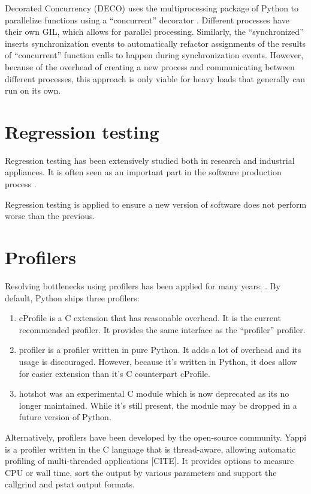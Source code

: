 Decorated Concurrency (DECO) uses the multiprocessing package of Python to parallelize functions using a ``concurrent'' decorator \cite{sherman2016deco}.
Different processes have their own GIL, which allows for parallel processing.
Similarly, the ``synchronized''  inserts synchronization events to automatically refactor assignments of the results of ``concurrent'' function calls to happen during synchronization events.
However, because of the overhead of creating a new process and communicating between different processes, this approach is only viable for heavy loads that generally can run on its own.

\section{Regression testing}
Regression testing has been extensively studied both in research and industrial appliances.
It is often seen as an important part in the software production process \cite{ghaith2013profile}.

Regression testing is applied to ensure a new version of software does not perform worse than the previous.



\section{Profilers}
Resolving bottlenecks using profilers has been applied for many years: \cite{pesterev2010locating, gorelick2014high, fan2013performance}.
By default, Python ships three profilers:

\begin{enumerate}
	\item cProfile is a C extension that has reasonable overhead. It is the current recommended profiler. It provides the same interface as the ``profiler'' profiler.
	\item profiler is a profiler written in pure Python. It adds a lot of overhead and its usage is discouraged. However, because it's written in Python, it does allow for easier extension than it's C counterpart cProfile.
	\item hotshot was an experimental C module which is now deprecated as its no longer maintained. While it's still present, the module may be dropped in a future version of Python.
\end{enumerate}

Alternatively, profilers have been developed by the open-source community.
Yappi is a profiler written in the C language that is thread-aware, allowing automatic profiling of multi-threaded applications [CITE].
It provides options to measure CPU or wall time, sort the output by various parameters and support the callgrind and pstat output formats.

